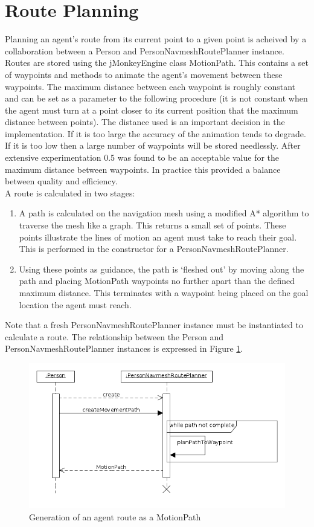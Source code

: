 %
\section{Route Planning}
\label{Imp:sec:routePlanning}
Planning an agent's route from its current point to a given point is acheived by a collaboration between a Person and PersonNavmeshRoutePlanner instance. Routes are stored using the jMonkeyEngine class MotionPath. This contains a set of waypoints and methods to animate the agent's movement between these waypoints. The maximum distance between each waypoint is roughly constant and can be set as a parameter to the following procedure (it is not constant when the agent must turn at a point closer to its current position that the maximum distance between points). The distance used is an important decision in the implementation. If it is too large the accuracy of the animation tends to degrade. If it is too low then a large number of waypoints will be stored needlessly. After extensive experimentation 0.5 was found to be an acceptable value for the maximum distance between waypoints. In practice this provided a balance between quality and efficiency.\\
A route is calculated in two stages:
\begin{enumerate}
\item{A path is calculated on the navigation mesh using a modified A* algorithm to traverse the mesh like a graph. This returns a small set of points. These points illustrate the lines of motion an agent must take to reach their goal. This is performed in the constructor for a PersonNavmeshRoutePlanner.}
\item{Using these points as guidance, the path is `fleshed out' by moving along the path and placing MotionPath waypoints no further apart than the defined maximum
distance. This terminates with a waypoint being placed on the goal location the agent must reach.}
\end{enumerate}
Note that a fresh PersonNavmeshRoutePlanner instance must be instantiated to calculate a route. The relationship between the Person and PersonNavmeshRoutePlanner instances is expressed in Figure \ref{fig:route_plan_sequence}.

\begin{figure}
\label{fig:route_plan_sequence}
\centering
\includegraphics[scale=0.5]{../UMLDiagrams/RoutePlanningSequence.png}
\caption{Generation of an agent route as a MotionPath}
\end{figure}


